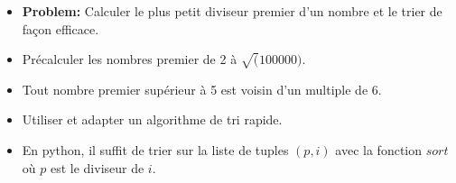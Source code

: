 \begin{frame}
    \frametitle{\problemtitle}
    \begin{itemize}
        \item<+-> \textbf{Problem:} Calculer le plus petit diviseur premier d'un nombre et le trier de façon efficace.
        \item<+-> Précalculer les nombres premier de 2 à $\sqrt(100000)$.
        \item<+-> Tout nombre premier supérieur à 5 est voisin d'un multiple de 6.
        \item<+-> Utiliser et adapter un algorithme de tri rapide.
        \item<+-> En python, il suffit de trier sur la liste de tuples $(p, i)$ avec la fonction $sort$ où $p$ est le diviseur de $i$.


    \end{itemize}
\end{frame}
